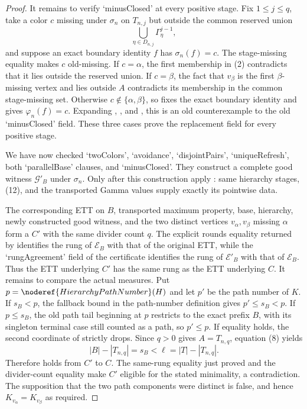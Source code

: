 \begin{proof}
It remains to verify `minusClosed' at every positive stage.  Fix
$1\leq j\leq q$, take a color $c$ missing under $\sigma_n$ on $T_{n,j}$
but outside the common reserved union
\[
                 \bigcup_{\eta\in D_{n,j}}\Gamma^{j-1}_\eta,
\]
and suppose an exact boundary identity $f$ has $\sigma_n(f)=c$.
The stage-missing equality makes $c$ old-missing.  If $c=\alpha$, the
first membership in (2) contradicts that it lies outside the reserved
union.  If $c=\beta$, the fact that $v_\beta$ is the first
$\beta$-missing vertex and lies outside $A$ contradicts its membership in
the common stage-missing set.  Otherwise
$c\notin\{\alpha,\beta\}$, so  fixes the
exact boundary identity and gives $\varphi_n(f)=c$.  Expanding
, , and
, this is an old counterexample to the old
`minusClosed' field.  These three cases prove the replacement field for
every positive stage.

We have now checked `twoColors', `avoidance', `disjointPairs',
`uniqueRefresh', both `parallelBase' clauses, and `minusClosed'.  They
construct a complete good witness $\mathcal G'_B$ under $\sigma_n$.  Only
after this construction apply : same hierarchy
stages, (12), and the transported Gamma values supply exactly its pointwise
data.

The corresponding ETT on $B$, transported maximum property, base,
hierarchy, newly constructed good witness, and the two distinct vertices
$v_\alpha,v_\beta$ missing $\alpha$ form a
 $C'$ with the same divider count $q$.
The explicit rounds equality returned by
 identifies the rung of
$\mathcal E_B$ with that of the original ETT, while the `rungAgreement'
field of the  certificate
identifies the rung of $\mathcal E'_B$ with that of $\mathcal E_B$.
Thus the ETT underlying $C'$ has the same rung as the ETT underlying
$C$.
It remains to compare the actual measures.  Put
$p=\noderef{HierarchyPathNumber}(H)$ and let $p'$ be the path number of
$K$.  If $s_B<p$, the fallback bound in the path-number definition gives
$p'\leq s_B<p$.  If $p\leq s_B$, the old path tail beginning at $p$
restricts to the exact prefix $B$, with its singleton terminal case still
counted as a path, so $p'\leq p$.  If equality holds, the second coordinate
of  strictly drops.  Since
$q>0$ gives $A=T_{n,q}$, equation (8) yields
\[
       |B|-|T_{n,q}|=s_B<\ell=|T|-|T_{n,q}|.
\]
Therefore  holds from $C'$ to $C$.
The same-rung equality just proved and the divider-count equality make
$C'$ eligible for the stated minimality, a contradiction.  The
supposition that the two path
components were distinct is false, and hence
$K_{v_\alpha}=K_{v_\beta}$ as required.
\end{proof}
